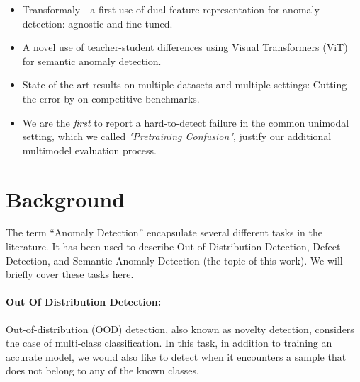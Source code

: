 \documentclass[10pt,twocolumn,letterpaper]{article}
\begin{document}
\begin{itemize}[noitemsep]
\item Transformaly - a first use of dual feature representation for anomaly detection: agnostic and fine-tuned.
\item A novel use of teacher-student differences using Visual Transformers (ViT) for semantic anomaly detection.
\item State of the art results on multiple datasets and multiple settings: Cutting the error by  on competitive benchmarks.
\item We are the \emph{first} to report a hard-to-detect failure in the common unimodal setting, which we called \emph{"Pretraining Confusion"}, justify our additional multimodel evaluation process.
\end{itemize}







































 
\section{Background}

The term “Anomaly Detection” encapsulate several different tasks in the literature. It has been used to describe Out-of-Distribution Detection, Defect Detection, and Semantic Anomaly Detection (the topic of this work). We will briefly cover these tasks here.




\paragraph{\bf Out Of Distribution Detection:}
Out-of-distribution (OOD) detection, also known as novelty detection, considers the case of multi-class classification. In this task, in addition to training an accurate model, we would also like to detect when it encounters a sample that does not belong to any of the known classes.
\end{document}

